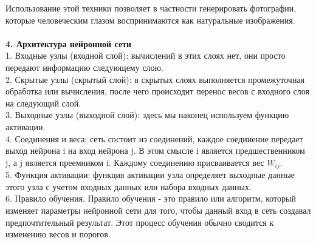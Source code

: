 \documentclass{article}
\begin{document}
    Использование этой техники позволяет в частности генерировать фотографии, которые человеческим глазом воспринимаются как натуральные изображения.  \\ \\
    \textbf{4. Архитектура нейронной сети}\\
    1. Входные узлы (входной слой): вычислений в этих слоях нет, они просто передают информацию следующему слою.\\
    2. Скрытые узлы (скрытый слой): в скрытых слоях выполняется промежуточная обработка или вычисления, после чего происходит перенос весов с входного слоя на следующий слой.\\
    3. Выходные узлы (выходной слой): здесь мы наконец используем функцию активации.\\
    4. Соединения и веса: сеть состоит из соединений, каждое соединение передает выход нейрона i на вход нейрона j. В этом смысле i является предшественником j, а j является преемником i. Каждому соединению присваивается вес $W_{ij}$.\\
    5. Функция активации: функция активации узла определяет выходные данные этого узла с учетом входных данных или набора входных данных. \\
    6. Правило обучения. Правило обучения - это правило или алгоритм, который изменяет параметры нейронной сети для того, чтобы данный вход в сеть создавал предпочтительный результат. Этот процесс обучения обычно сводится к изменению весов и порогов.\\
\end{document}

